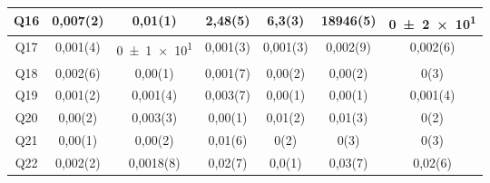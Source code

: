 \documentclass[12pt, letter paper]{report}
\begin{document}
\begin{table}[H]
\begin{tabular}{| c | c | c | c | c | c | c |}
          Q16 & 0,007(2) & 0,01(1)      & 2,48(5)      & 6,3(3)       & 18946(5)       & \num{0(2)e1} \\ \hline
          Q17 & 0,001(4) & \num{0(1)e1} & 0,001(3)     & 0,001(3)     & 0,002(9)       & 0,002(6)     \\ \hline
          Q18 & 0,002(6) & 0,00(1)      & 0,001(7)     & 0,00(2)      & 0,00(2)        & 0(3)         \\ \hline
          Q19 & 0,001(2) & 0,001(4)     & 0,003(7)     & 0,00(1)      & 0,00(1)        & 0,001(4)     \\ \hline
          Q20 & 0,00(2)  & 0,003(3)     & 0,00(1)      & 0,01(2)      & 0,01(3)        & 0(2)         \\ \hline
          Q21 & 0,00(1)  & 0,00(2)      & 0,01(6)      & 0(2)         & 0(3)           & 0(3)         \\ \hline
          Q22 & 0,002(2) & 0,0018(8)    & 0,02(7)      & 0,0(1)       & 0,03(7)        & 0,02(6)      \\ \hline
        \end{tabular}
      \end{table}
\end{document}
